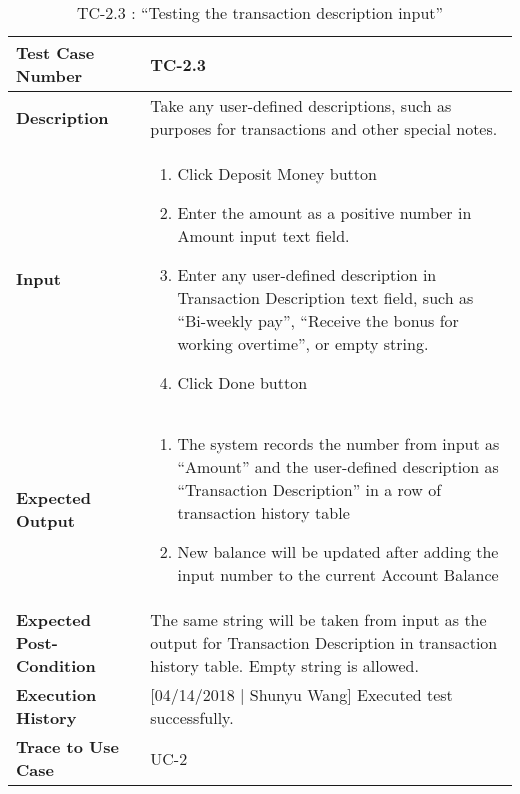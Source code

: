 \documentclass[12pt]{article}
\begin{document}
\begin{table}[H]
\caption{TC-2.3 : “Testing the transaction description input”}
\begin{center}
\begin{tabular}{|p{5.5	cm}|p{11cm}|}
\hline
\bf Test Case Number & 
TC-2.3 \\
\hline
\bf Description & 
Take any user-defined descriptions, such as purposes for transactions and other special notes.\\
\hline
\bf Input & 
\begin{enumerate}
  \item Click Deposit Money button
  \item Enter the amount as a positive number in Amount input text field.
  \item Enter any user-defined description in Transaction Description text field, such as “Bi-weekly pay”, “Receive the bonus for working overtime”, or empty string.
  \item Click Done button
\end{enumerate} \\
\hline
\bf Expected Output & 
\begin{enumerate}
  \item The system records the number from input as “Amount” and the user-defined description as “Transaction Description” in a row of transaction history table
  \item New balance will be updated after adding the input number to the current Account Balance
\end{enumerate} \\
\hline
\bf Expected Post-Condition & 
The same string will be taken from input as the output for Transaction Description in transaction history table. Empty string is allowed.\\
\hline
\bf Execution History & 
[04/14/2018 | Shunyu Wang] Executed test successfully.\\
\hline
\bf Trace to Use Case & 
UC-2\\
\hline

\end{tabular}
\end{center}
\end{table}
\end{document}
